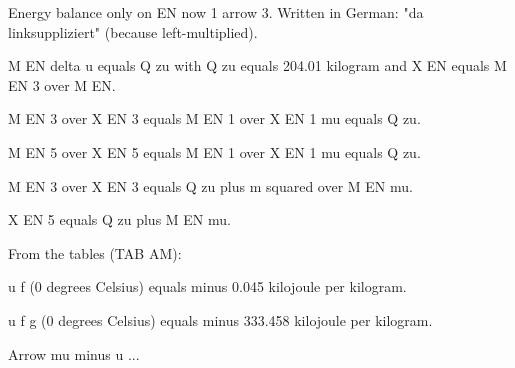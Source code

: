 Energy balance only on EN now 1 arrow 3. Written in German: "da linksuppliziert" (because left-multiplied). 

M EN delta u equals Q zu with Q zu equals 204.01 kilogram and X EN equals M EN 3 over M EN. 

M EN 3 over X EN 3 equals M EN 1 over X EN 1 mu equals Q zu. 

M EN 5 over X EN 5 equals M EN 1 over X EN 1 mu equals Q zu. 

M EN 3 over X EN 3 equals Q zu plus m squared over M EN mu.

X EN 5 equals Q zu plus M EN mu.

From the tables (TAB AM):

u f (0 degrees Celsius) equals minus 0.045 kilojoule per kilogram.

u f g (0 degrees Celsius) equals minus 333.458 kilojoule per kilogram.

Arrow mu minus u ...